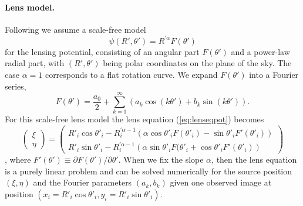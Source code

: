 \paragraph{Lens model.} Following \citet{EvansWitt} we assume a scale-free model
\begin{equation}
\psi(R',\theta') = R^{'\alpha} F(\theta') \label{eq:scalefreemodel}
\end{equation}
for the lensing potential, consisting of an angular part $F(\theta')$ and a power-law radial part, with $(R',\theta')$ being polar coordinates on the plane of the sky. The case $\alpha = 1$ corresponds to a flat rotation curve. We expand $F(\theta')$ into a Fourier series,
\begin{equation}
F(\theta') = \frac{a_0}{2} + \sum_{k=1}^{\infty} \left(a_k \cos(k\theta') + b_k \sin (k\theta') \right). \label{eq:Fourieransatz}
\end{equation}
For this scale-free lens model the lens equation (\ref{eq:lenseqpot}) becomes
\begin{equation}
\begin{pmatrix} \xi \\ \eta \end{pmatrix} = \begin{pmatrix} R'_i \cos \theta'_i - R_i^{'\alpha-1} \left(\alpha \cos \theta'_i F(\theta'_i) - \sin \theta'_i F'(\theta'_i) \right) \\ R'_i \sin \theta'_i - R_i^{'\alpha-1} \left(\alpha \sin \theta'_i F(\theta'_i + \cos \theta'_i F'(\theta'_i) \right)\end{pmatrix}\label{eq:Fourierlenseq}
\end{equation}
\citep{EvansWitt}, where $F'(\theta') \equiv \partial F(\theta') / \partial \theta'$. When we fix the slope $\alpha$, then the lens equation is a purely linear problem and can be solved numerically for the source position $(\xi,\eta)$ and the Fourier parameters $(a_k,b_k)$ given one observed image at position $(x_i=R'_i \cos \theta'_i,y_i=R'_i \sin \theta'_i)$. 

